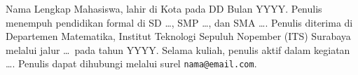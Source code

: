 Nama Lengkap Mahasiswa, lahir di Kota pada DD Bulan YYYY. Penulis menempuh pendidikan formal di SD \dots, SMP \dots, dan SMA \dots. Penulis diterima di Departemen Matematika, Institut Teknologi Sepuluh Nopember (ITS) Surabaya melalui jalur \dots\ pada tahun YYYY. Selama kuliah, penulis aktif dalam kegiatan \dots. Penulis dapat dihubungi melalui surel \texttt{nama@email.com}.

